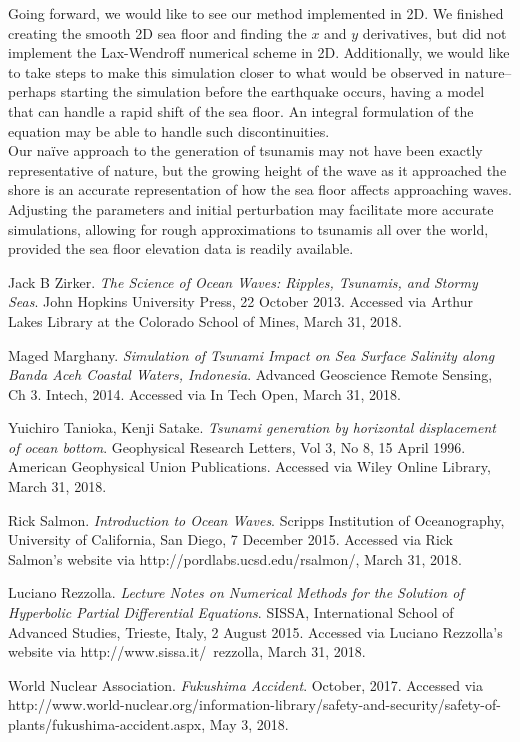 \documentclass[12pt,a4]{article}
\begin{document}
\noindent Going forward, we would like to see our method implemented in 2D. We finished creating the smooth 2D sea floor and finding the $x$ and $y$ derivatives, but did not implement the Lax-Wendroff numerical scheme in 2D. Additionally, we would like to take steps to make this simulation closer to what would be observed in nature--perhaps starting the simulation before the earthquake occurs, having a model that can handle a rapid shift of the sea floor. An integral formulation of the equation may be able to handle such discontinuities. \\

\noindent Our na\"ive approach to the generation of tsunamis may not have been exactly representative of nature, but the growing height of the wave as it approached the shore is an accurate representation of how the sea floor affects approaching waves. Adjusting the parameters and initial perturbation may facilitate more accurate simulations, allowing for rough approximations to tsunamis all over the world, provided the sea floor elevation data is readily available.

\begin{thebibliography}{1}
Jack B Zirker.
\textit{The Science of Ocean Waves: Ripples, Tsunamis, and Stormy Seas}.
John Hopkins University Press, 22 October 2013. 
Accessed via Arthur Lakes Library at the Colorado School of Mines, March 31, 2018.
    
Maged Marghany.
\textit{Simulation of Tsunami Impact on Sea Surface Salinity along Banda Aceh Coastal Waters, Indonesia}.
Advanced Geoscience Remote Sensing, Ch 3. Intech, 2014. Accessed via In Tech Open, March 31, 2018.
    
Yuichiro Tanioka, Kenji Satake.
\textit{Tsunami generation by horizontal displacement of ocean bottom}.
Geophysical Research Letters, Vol 3, No 8, 15 April 1996. American Geophysical Union Publications. Accessed via Wiley Online Library, March 31, 2018.

Rick Salmon.
\textit{Introduction to Ocean Waves}.
Scripps Institution of Oceanography, University of California, San Diego, 7 December 2015. Accessed via Rick Salmon's website via http://pordlabs.ucsd.edu/rsalmon/, March 31, 2018.

Luciano Rezzolla.
\textit{Lecture Notes on Numerical Methods for the Solution of Hyperbolic Partial Differential Equations}.
SISSA, International School of Advanced Studies, Trieste, Italy, 2 August 2015. Accessed via Luciano Rezzolla's website via http://www.sissa.it/~rezzolla, March 31, 2018.

World Nuclear Association.
\textit{Fukushima Accident}.
October, 2017. Accessed via http://www.world-nuclear.org/information-library/safety-and-security/safety-of-plants/fukushima-accident.aspx, May 3, 2018.

\end{thebibliography}
	
\end{document}
